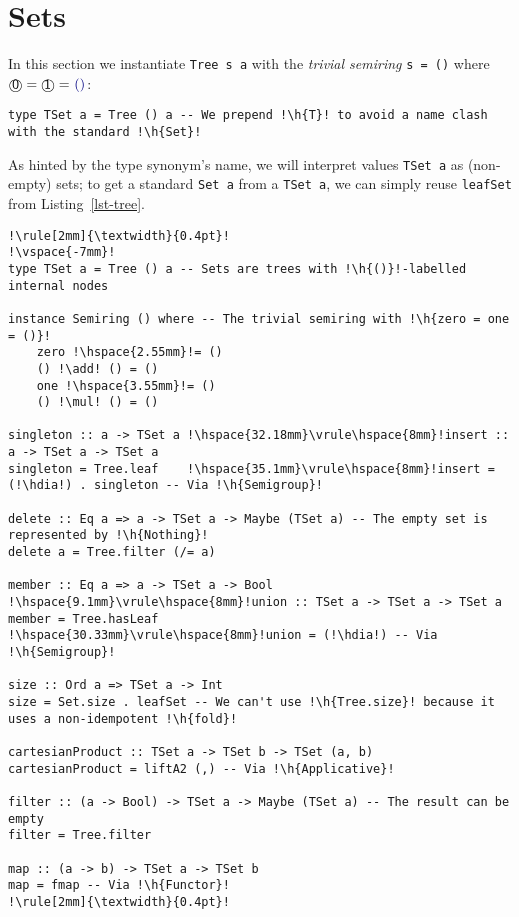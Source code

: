\documentclass[english,submission]{programming}
\newcommand{\code}[1]{\lstinline[mathescape]|#1|}
\newcommand{\hcode}[1]{{\color{darkblue} \lstinline[keywordstyle={}]|#1|}} %
\newcommand{\h}[1]{{\itshape\color{grayblue}#1}} %
\newcommand{\hdia}{\,\text{\raisebox{-0.2mm}{\Large\color{darkblue} $\diamond$}}\,}
\newcommand{\add}{\text{\raisebox{-0.1mm}{\large $\oplus$}}}
\newcommand{\mul}{\text{\raisebox{-0.1mm}{\large $\otimes$}}}
\newcommand{\zero}{\raisebox{-0.2mm}{\textcircled{\textsf{0}}}\xspace}
\newcommand{\one}{\raisebox{-0.2mm}{\textcircled{\textsf{\hspace{-0.2mm}1}}}\xspace}
\begin{document}
\section{Sets}\label{sec-set}

In this section we instantiate \hcode{Tree s a} with the \emph{trivial semiring}
\hcode{s = ()} where $\zero = \one = \text{\hcode{()}}$:

\begin{lstlisting}
type TSet a = Tree () a -- We prepend !\h{T}! to avoid a name clash with the standard !\h{Set}!
\end{lstlisting}

\noindent
As hinted by the type synonym's name, we will interpret values \hcode{TSet a} as
(non-empty) sets; to get a standard \hcode{Set a} from a \hcode{TSet a}, we can
simply reuse \hcode{leafSet} from Listing~\ref{lst-tree}.

\begin{lstlisting}[label=lst-set,xleftmargin=0pt,belowskip=7pt,caption={
    Implementing a part of the standard \code{Data.S}\code{et} API with
    \hcode{TSet}.
}]
!\rule[2mm]{\textwidth}{0.4pt}!
!\vspace{-7mm}!
type TSet a = Tree () a -- Sets are trees with !\h{()}!-labelled internal nodes

instance Semiring () where -- The trivial semiring with !\h{zero = one = ()}!
    zero !\hspace{2.55mm}!= ()
    () !\add! () = ()
    one !\hspace{3.55mm}!= ()
    () !\mul! () = ()

singleton :: a -> TSet a !\hspace{32.18mm}\vrule\hspace{8mm}!insert :: a -> TSet a -> TSet a
singleton = Tree.leaf    !\hspace{35.1mm}\vrule\hspace{8mm}!insert = (!\hdia!) . singleton -- Via !\h{Semigroup}!

delete :: Eq a => a -> TSet a -> Maybe (TSet a) -- The empty set is represented by !\h{Nothing}!
delete a = Tree.filter (/= a)

member :: Eq a => a -> TSet a -> Bool !\hspace{9.1mm}\vrule\hspace{8mm}!union :: TSet a -> TSet a -> TSet a
member = Tree.hasLeaf                 !\hspace{30.33mm}\vrule\hspace{8mm}!union = (!\hdia!) -- Via !\h{Semigroup}!

size :: Ord a => TSet a -> Int
size = Set.size . leafSet -- We can't use !\h{Tree.size}! because it uses a non-idempotent !\h{fold}!

cartesianProduct :: TSet a -> TSet b -> TSet (a, b)
cartesianProduct = liftA2 (,) -- Via !\h{Applicative}!

filter :: (a -> Bool) -> TSet a -> Maybe (TSet a) -- The result can be empty
filter = Tree.filter

map :: (a -> b) -> TSet a -> TSet b
map = fmap -- Via !\h{Functor}!
!\rule[2mm]{\textwidth}{0.4pt}!
\end{lstlisting}
\end{document}
